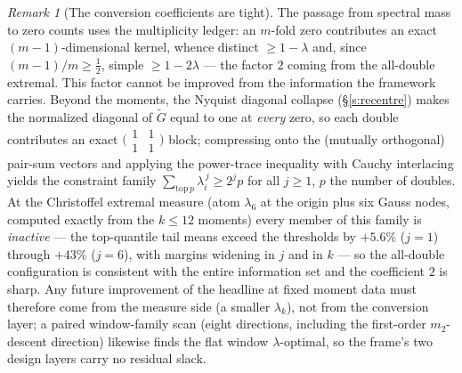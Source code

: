 \documentclass[11pt]{article}
\numberwithin{equation}{section}
\theoremstyle{definition}
\theoremstyle{remark}
\newtheorem{remark}[theorem]{Remark}
\begin{document}
\begin{remark}[The conversion coefficients are
tight]\label{r:tight2}
The passage from spectral mass to zero counts uses the
multiplicity ledger: an $m$-fold zero contributes an exact
$(m{-}1)$-dimensional kernel, whence distinct
$\ge1-\lambda$ and, since $(m-1)/m\ge\tfrac12$, simple
$\ge1-2\lambda$ --- the factor $2$ coming from the all-double
extremal. This factor cannot be improved from the information
the framework carries. Beyond the moments, the Nyquist
diagonal collapse (\S\ref{s:recentre}) makes the normalized
diagonal of $\widetilde G$ equal to one at \emph{every} zero,
so each double contributes an exact
$\bigl(\begin{smallmatrix}1&1\\1&1\end{smallmatrix}\bigr)$
block; compressing onto the (mutually orthogonal) pair-sum
vectors and applying the power-trace inequality with Cauchy
interlacing yields the constraint family
$\sum_{\mathrm{top}\,p}\lambda_i^{\,j}\ge2^{j}p$ for all
$j\ge1$, $p$ the number of doubles. At the Christoffel
extremal measure (atom $\lambda_6$ at the origin plus six
Gauss nodes, computed exactly from the $k\le12$ moments) every
member of this family is \emph{inactive} --- the top-quantile
tail means exceed the thresholds by $+5.6\%$ ($j=1$) through
$+43\%$ ($j=6$), with margins widening in $j$ and in $k$ ---
so the all-double configuration is consistent with the entire
information set and the coefficient $2$ is sharp. Any future
improvement of the headline at fixed moment data must
therefore come from the measure side (a smaller
$\lambda_k$), not from the conversion layer; a paired
window-family scan (eight directions, including the
first-order $m_2$-descent direction) likewise finds the flat
window $\lambda$-optimal, so the frame's two design layers
carry no residual slack.
\end{remark}
\end{document}
